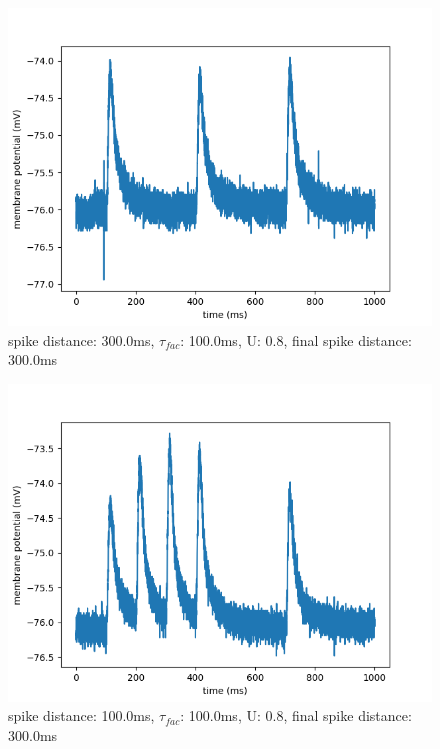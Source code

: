 \documentclass[10pt,a4paper]{scrartcl}
\begin{document}
\begin{figure} [ht]
\begin{center}
\label{fig:abb22}
\caption{spike distance: 300.0ms, $\tau_{fac}$: 100.0ms, U: 0.8, final spike distance: 300.0ms}
\includegraphics[scale=0.35]{pictures/final_spike_variation_12.pdf} 
\end{center}
\end{figure}

\newpage

\begin{figure} [ht]
\begin{center}
\label{fig:abb23}
\caption{spike distance: 100.0ms, $\tau_{fac}$: 100.0ms, U: 0.8, final spike distance: 300.0ms}
\includegraphics[scale=0.35]{pictures/final_spike_variation_13.pdf} 
\end{center}
\end{figure}
\end{document}

